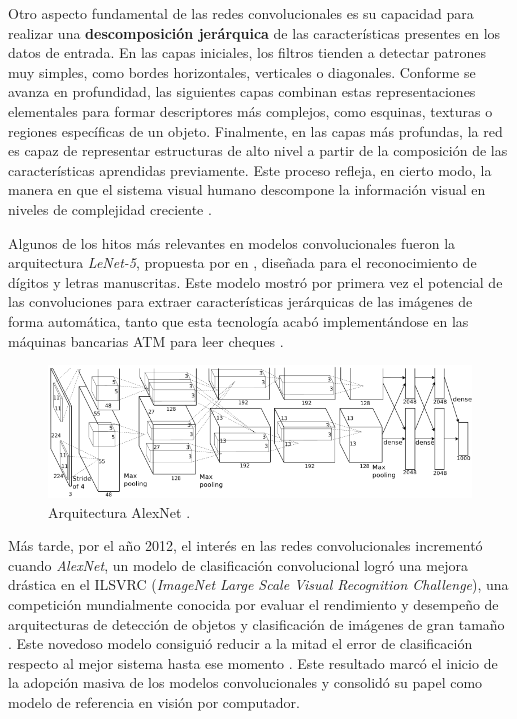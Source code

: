 Otro aspecto fundamental de las redes convolucionales es su capacidad para realizar una \textbf{descomposición jerárquica} de las características presentes en los datos de entrada. En las capas iniciales, los filtros tienden a detectar patrones muy simples, como bordes horizontales, verticales o diagonales. Conforme se avanza en profundidad, las siguientes capas combinan estas representaciones elementales para formar descriptores más complejos, como esquinas, texturas o regiones específicas de un objeto. Finalmente, en las capas más profundas, la red es capaz de representar estructuras de alto nivel a partir de la composición de las características aprendidas previamente. Este proceso refleja, en cierto modo, la manera en que el sistema visual humano descompone la información visual en niveles de complejidad creciente \cite{dl_python__chollet_2021, nn_dl__michael_nielsen_2015, dl__goodfellow_2016}.

Algunos de los hitos más relevantes en modelos convolucionales fueron la arquitectura \textit{LeNet-5}, propuesta por \citeauthor{lecun-98} en \citeyear{lecun-98}, diseñada para el reconocimiento de dígitos y letras manuscritas. Este modelo mostró por primera vez el potencial de las convoluciones para extraer características jerárquicas de las imágenes de forma automática, tanto que esta tecnología acabó implementándose en las máquinas bancarias ATM para leer cheques \cite{lecun-98}.

\begin{figure}[ht]
	\centering
	\includegraphics[width=1\linewidth]{figures/ejemplos/AlexNet_Original_block_diagram.png}
	\caption{Arquitectura AlexNet \cite{Krizhevsky2012ImageNetCW}.}
	\label{img:alexnet}
\end{figure}


Más tarde, por el año 2012, el interés en las redes convolucionales incrementó cuando \textit{AlexNet}, un modelo de clasificación convolucional logró una mejora drástica en el ILSVRC (\textit{ImageNet Large Scale Visual Recognition Challenge}), una competición mundialmente conocida por evaluar el rendimiento y desempeño de arquitecturas de detección de objetos y clasificación de imágenes de gran tamaño \cite{imagenet-web}. Este novedoso modelo consiguió reducir a la mitad el error de clasificación respecto al mejor sistema hasta ese momento \cite{Krizhevsky2012ImageNetCW}. Este resultado marcó el inicio de la adopción masiva de los modelos convolucionales y consolidó su papel como modelo de referencia en visión por computador.

